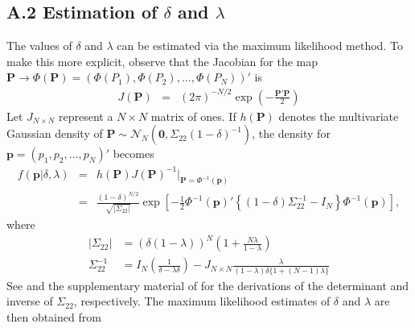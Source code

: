 \documentclass[11pt]{article}
\theoremstyle{definition}
\theoremstyle{definition}
\begin{document}
\subsection*{A.2 Estimation of $\delta$ and $\lambda$}


The values of $\delta$ and $\lambda$ can be estimated via the maximum likelihood method. To make this more explicit, observe that the Jacobian for the map $\boldsymbol{P} \to \Phi\left(\boldsymbol{P}\right) = (\Phi(P_1), \Phi(P_2), \dots, \Phi(P_N))'$ is
\begin{eqnarray*}
J(\boldsymbol{P}) &=& (2\pi)^{-N/2} \exp \left( - \frac{\boldsymbol{P}' \boldsymbol{P}}{2}   \right) 
\end{eqnarray*}
%
Let $J_{N \times N}$ represent a $N\times N$ matrix of ones. If $h(\boldsymbol{P})$ denotes the multivariate Gaussian density of $\boldsymbol{P} \sim \mathcal{N}_N\left(\boldsymbol{0}, \Sigma_{22} (1-\delta)^{-1}\right)$,
the density for  $\boldsymbol{p} = (p_1, p_2, \dots, p_N)'$ becomes
\begin{eqnarray*}
 f\left(\boldsymbol{p} | \delta, \lambda \right) &=& h(\boldsymbol{P}) J(\boldsymbol{P})^{-1} \bigg|_{\boldsymbol{P} = \Phi^{-1}(\boldsymbol{p})}\\
&=& \frac{(1-\delta)^{N/2}}{\sqrt{ \left|\Sigma_{22}\right|}} \exp\left[ -\frac{1}{2} \Phi^{-1}(\boldsymbol{p})' \left\{ (1-\delta) \Sigma_{22}^{-1} - I_N \right\} \Phi^{-1}(\boldsymbol{p})  \right],
\end{eqnarray*}
where
\begin{align}
\left| \Sigma_{22}\right| &= (\delta(1- \lambda))^N \left(1+\frac{N \lambda}{1 - \lambda} \right) \nonumber\\
\Sigma_{22}^{-1} &= I_N \left(\frac{1}{\delta-\lambda\delta} \right) - J_{N \times N} \frac{\lambda}{(1-\lambda)\delta\{1+(N-1) \lambda\}} \label{inverse}
\end{align}
See \citet{rao2009linear} and the supplementary material of \citet{dobbin2005sample} for the derivations of the determinant and inverse of $\Sigma_{22}$, respectively. The maximum likelihood estimates of $\delta$ and $\lambda$ are then obtained from
\end{document}
